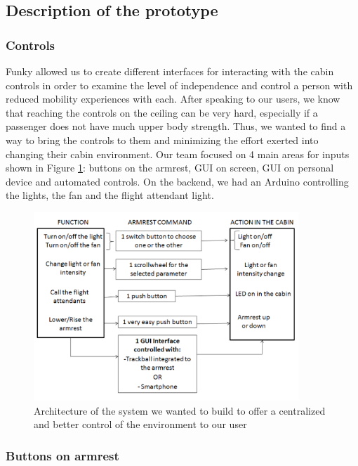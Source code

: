 \subsection{Description of the prototype}


\subsubsection*{Controls}

Funky allowed us to create different interfaces for interacting with the cabin controls in order to examine the level of independence and control a person with reduced mobility experiences with each. After speaking to our users, we know that reaching the controls on the ceiling can be very hard, especially if a passenger does not have much upper body strength. Thus, we wanted to find a way to bring the controls to them and minimizing the effort exerted into changing their cabin environment.  Our team focused on 4 main areas for inputs shown in Figure \ref{fig:ControlArchitecture.jpg}: buttons on the armrest, GUI on screen, GUI on personal device and automated controls.  On the backend, we had an Arduino controlling the lights, the fan and the flight attendant light. 


\begin{figure}[h]
  \centering
     \includegraphics[width=10cm]{images/ControlArchitecture.jpg}
   \caption{Architecture of the system we wanted to build to offer a centralized and better control of the environment to our user}
  \label{fig:ControlArchitecture.jpg}
\end{figure}

\subsubsection*{Buttons on armrest}

